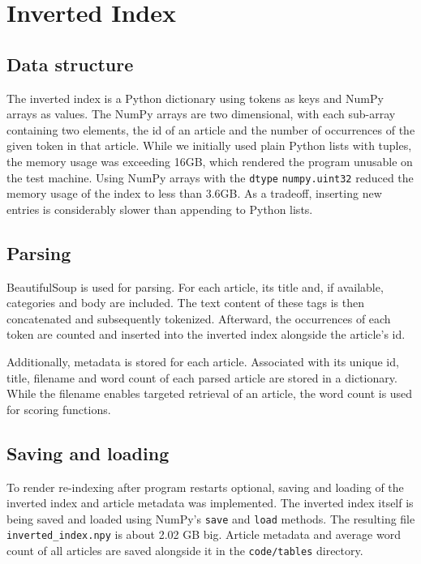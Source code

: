 \section{Inverted Index}
\label{sec:index}

\subsection{Data structure}

The inverted index is a Python dictionary using tokens as keys and NumPy arrays as values.
The NumPy arrays are two dimensional, with each sub-array containing two elements, the id of an article and the number of occurrences of the given token in that article.
While we initially used plain Python lists with tuples, the memory usage was exceeding 16GB, which rendered the program unusable on the test machine.
Using NumPy arrays with the \verb|dtype| \verb|numpy.uint32| reduced the memory usage of the index to less than 3.6GB.
As a tradeoff, inserting new entries is considerably slower than appending to Python lists.

\subsection{Parsing}

BeautifulSoup is used for parsing.
For each article, its title and, if available, categories and body are included.
The text content of these tags is then concatenated and subsequently tokenized.
Afterward, the occurrences of each token are counted and inserted into the inverted index alongside the article's id.

Additionally, metadata is stored for each article.
Associated with its unique id, title, filename and word count of each parsed article are stored in a dictionary.
While the filename enables targeted retrieval of an article, the word count is used for scoring functions.

\subsection{Saving and loading}

To render re-indexing after program restarts optional, saving and loading of the inverted index and article metadata was implemented.
The inverted index itself is being saved and loaded using NumPy's \verb|save| and \verb|load| methods.
The resulting file \verb|inverted_index.npy| is about 2.02 GB big.
Article metadata and average word count of all articles are saved alongside it in the \verb|code/tables| directory.

